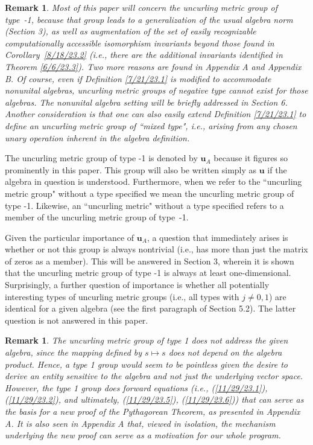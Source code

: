 \documentclass{amsart}
\numberwithin{equation}{section}
\newtheorem{remark}[theorem]{Remark}
\theoremstyle{definition}
\numberwithin{theorem}{section}
\begin{document}
\begin{remark}\label{10/16/23.1} {\rm  Most of this paper will concern the uncurling metric group of \mbox{type -1}, because that group leads to a generalization of the usual algebra norm (Section 3), as well as augmentation of the set of easily recognizable computationally accessible isomorphism invariants beyond those found in \mbox{Corollary \ref{8/18/23.2}} (i.e., there are the additional invariants identified in Theorem \ref{6/6/23.3}). Two more reasons are found in Appendix A and Appendix B. Of course, even if Definition \ref{7/21/23.1} is modified to accommodate nonunital algebras, uncurling metric groups of negative type cannot exist for those algebras.  The nonunital algebra setting will be briefly addressed in Section 6.  Another consideration is that one can also easily extend Definition \ref{7/21/23.1} to define an uncurling metric group of ``mixed type", i.e., arising from any chosen unary operation inherent in the algebra definition.} \end{remark}
 
   
 The uncurling metric group of type -1 is denoted by $\mathbf{u}_A$ because it figures so prominently in this paper. This group will also be written simply as $\mathbf{u}$ if the algebra in question is understood.  Furthermore, when we refer to the ``uncurling metric group" without a type specified we mean the uncurling metric group of type -1.  Likewise, an ``uncurling metric" without a type specified refers to a member of the uncurling metric group of \mbox{type -1}. 
 
      Given the particular importance of $\mathbf{u}_A$, a question that immediately arises is whether or not this group is always nontrivial (i.e., has more than just the matrix of zeros as a member).  This will be answered in Section 3, wherein it is shown that the uncurling metric group of type -1 is always at least one-dimensional.  Surprisingly, a further question of importance is whether all potentially interesting types of uncurling metric groups (i.e., all types with $j\ne 0,1$) are identical for a given algebra (see the first paragraph of Section 5.2).  The latter question is not answered in this paper.

\begin{remark}\label{11/21/23.1} {\rm The uncurling metric group of type 1 does not address the given algebra, since the mapping defined by $s\mapsto s$ does not depend on the algebra product.  Hence, a type 1 group would seem to be pointless given the desire to derive an entity sensitive to the algebra and not just the underlying vector space.  However, the type 1 group does forward equations (i.e., (\ref{11/29/23.1}), (\ref{11/29/23.2}), and ultimately, (\ref{11/29/23.5}), (\ref{11/29/23.6})) that can serve as the basis for a new proof of the Pythagorean Theorem, as presented in Appendix A.  It is also seen in Appendix A that, viewed in isolation, the mechanism underlying the new proof can serve as a motivation for our whole program.}\end{remark}
\end{document}
